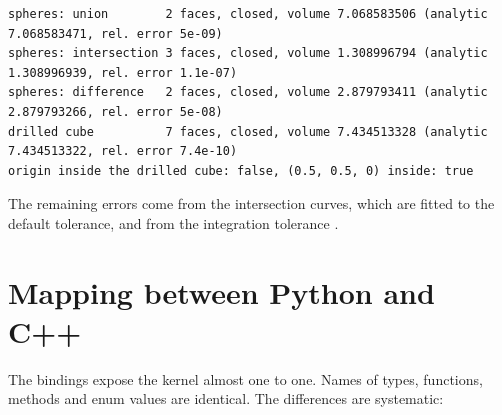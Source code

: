 \begin{lstlisting}[style=text]
spheres: union        2 faces, closed, volume 7.068583506 (analytic 7.068583471, rel. error 5e-09)
spheres: intersection 3 faces, closed, volume 1.308996794 (analytic 1.308996939, rel. error 1.1e-07)
spheres: difference   2 faces, closed, volume 2.879793411 (analytic 2.879793266, rel. error 5e-08)
drilled cube          7 faces, closed, volume 7.434513328 (analytic 7.434513322, rel. error 7.4e-10)
origin inside the drilled cube: false, (0.5, 0.5, 0) inside: true
\end{lstlisting}

The remaining errors come from the intersection curves, which are fitted to the default tolerance,
and from the integration tolerance .

\section{Mapping between Python and C++}\label{sec:cpp-mapping}

The bindings expose the kernel almost one to one. Names of types, functions, methods and enum
values are identical. The differences are systematic:

